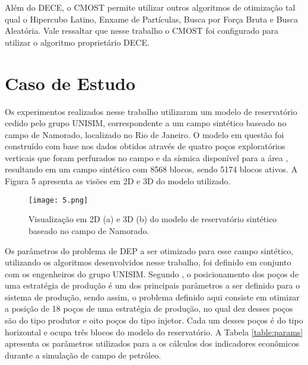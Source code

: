Além do DECE, o CMOST permite utilizar outros algoritmos de otimização tal qual o Hipercubo Latino, Enxame de Partículas, Busca por Força Bruta e Busca Aleatória. Vale ressaltar que nesse trabalho o CMOST foi configurado para utilizar o algoritmo proprietário DECE.

\section{Caso de Estudo}
\label{ch:4_CasoEstudo}
Os experimentos realizados nesse trabalho utilizaram um modelo de reservatório cedido pelo grupo UNISIM, correspondente a um campo sintético baseado no campo de Namorado, localizado no Rio de Janeiro. O modelo em questão foi construído com base nos dados obtidos através de quatro poços exploratórios verticais que foram perfurados no campo e da sísmica disponível para a área \cite{Silva2016}, resultando em um campo sintético com 8568 blocos, sendo 5174 blocos ativos. A Figura 5 apresenta as visões em 2D e 3D do modelo utilizado.

\begin{figure}[htb]

\texttt{[image: 5.png]}

\caption{Visualização em 2D (a) e 3D (b) do modelo de reservatório sintético baseado no campo de Namorado.}

\end{figure}

Os parâmetros do problema de DEP a ser otimizado para esse campo sintético, utilizando os algoritmos desenvolvidos nesse trabalho, foi definido em conjunto com os engenheiros do grupo UNISIM. Segundo , o posicionamento dos poços de uma estratégia de produção é um dos principais parâmetros a ser definido para o sistema de produção, sendo assim, o problema definido aqui consiste em otimizar a posição de 18 poços de uma estratégia de produção, no qual dez desses poços são do tipo produtor e oito poços do tipo injetor. Cada um desses poços é do tipo horizontal e ocupa três blocos do modelo do reservatório. A Tabela \ref{table:params} apresenta os parâmetros utilizados para a os cálculos dos indicadores econômicos durante a simulação de campo de petróleo.

